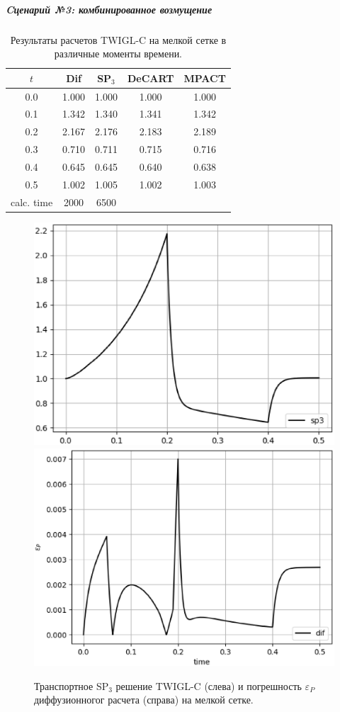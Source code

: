 \documentclass{crm-article}
\begin{document}
\subparagraph{Cценарий №3: комбинированное возмущение}
\begin{table}[htp]
\caption{Результаты расчетов TWIGL-C на мелкой сетке в различные моменты времени.}
\label{table:twigl-c}
\begin{center}
\begin{tabular}{c c c c c}
\hline
$t$ & Dif & SP$_3$ & DeCART & MPACT\\
\hline
0.0 & 1.000 & 1.000 & 1.000 & 1.000 \\
0.1 & 1.342 & 1.340 & 1.341 & 1.342 \\
0.2 & 2.167 & 2.176 & 2.183 & 2.189 \\
0.3 & 0.710 & 0.711 & 0.715 & 0.716 \\
0.4 & 0.645 & 0.645 & 0.640 & 0.638 \\
0.5 & 1.002 & 1.005 & 1.002 & 1.003 \\
\hline
calc. time & 2000 & 6500 \\
\end{tabular}
\end{center}
\end{table}
\begin{figure}[ht]
\begin{center}
	\includegraphics[width=0.4\linewidth]{sp3_ref_c.eps}\hspace{20pt}
	\includegraphics[width=0.4\linewidth]{odds_c.eps}\\
	\caption{\label{image:canonsummary} Транспортное SP$_3$ решение TWIGL-C (слева) и погрешность $\varepsilon_P$ диффузионногог расчета (справа) на мелкой сетке. }
	\label{ris:sp3_ref_c}
\end{center}
\end{figure}
\end{document}
